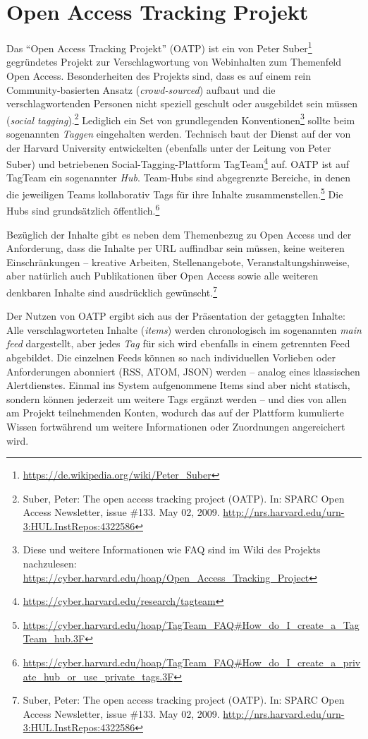 \documentclass[a4paper,
fontsize=11pt,
oneside,
numbers=noperiodatend,
parskip=half-,
bibliography=totoc,
final
]{scrartcl}
\begin{document}
\hypertarget{open-access-tracking-projekt}{%
\section{Open Access Tracking
Projekt}\label{open-access-tracking-projekt}}

Das \enquote{Open Access Tracking Projekt} (OATP) ist ein von Peter
Suber\footnote{\url{https://de.wikipedia.org/wiki/Peter_Suber}}
gegründetes Projekt zur Verschlagwortung von Webinhalten zum Themenfeld
Open Access. Besonderheiten des Projekts sind, dass es auf einem rein
Community-basierten Ansatz (\emph{crowd-sourced}) aufbaut und die
verschlagwortenden Personen nicht speziell geschult oder ausgebildet
sein müssen (\emph{social tagging}).\footnote{Suber, Peter: The open
  access tracking project (OATP). In: SPARC Open Access Newsletter,
  issue \#133. May 02, 2009.
  \url{http://nrs.harvard.edu/urn-3:HUL.InstRepos:4322586}} Lediglich
ein Set von grundlegenden Konventionen\footnote{Diese und weitere
  Informationen wie FAQ sind im Wiki des Projekts nachzulesen:
  \url{https://cyber.harvard.edu/hoap/Open_Access_Tracking_Project}}
sollte beim sogenannten \emph{Taggen} eingehalten werden. Technisch baut
der Dienst auf der von der Harvard University entwickelten (ebenfalls
unter der Leitung von Peter Suber) und betriebenen
Social-Tagging-Plattform TagTeam\footnote{\url{https://cyber.harvard.edu/research/tagteam}}
auf. OATP ist auf TagTeam ein sogenannter \emph{Hub}. Team-Hubs sind
abgegrenzte Bereiche, in denen die jeweiligen Teams kollaborativ Tags
für ihre Inhalte zusammenstellen.\footnote{\url{https://cyber.harvard.edu/hoap/TagTeam_FAQ\#How_do_I_create_a_TagTeam_hub.3F}}
Die Hubs sind grundsätzlich öffentlich.\footnote{\url{https://cyber.harvard.edu/hoap/TagTeam_FAQ\#How_do_I_create_a_private_hub_or_use_private_tags.3F}}

Bezüglich der Inhalte gibt es neben dem Themenbezug zu Open Access und
der Anforderung, dass die Inhalte per URL auffindbar sein müssen, keine
weiteren Einschränkungen -- kreative Arbeiten, Stellenangebote,
Veranstaltungshinweise, aber natürlich auch Publikationen über Open
Access sowie alle weiteren denkbaren Inhalte sind ausdrücklich
gewünscht.\footnote{Suber, Peter: The open access tracking project
  (OATP). In: SPARC Open Access Newsletter, issue \#133. May 02, 2009.
  \url{http://nrs.harvard.edu/urn-3:HUL.InstRepos:4322586}}

Der Nutzen von OATP ergibt sich aus der Präsentation der getaggten
Inhalte: Alle verschlagworteten Inhalte (\emph{items}) werden
chronologisch im sogenannten \emph{main feed} dargestellt, aber jedes
\emph{Tag} für sich wird ebenfalls in einem getrennten Feed abgebildet.
Die einzelnen Feeds können so nach individuellen Vorlieben oder
Anforderungen abonniert (RSS, ATOM, JSON) werden -- analog eines
klassischen Alertdienstes. Einmal ins System aufgenommene Items sind
aber nicht statisch, sondern können jederzeit um weitere Tags ergänzt
werden -- und dies von allen am Projekt teilnehmenden Konten, wodurch
das auf der Plattform kumulierte Wissen fortwährend um weitere
Informationen oder Zuordnungen angereichert wird.
\end{document}
